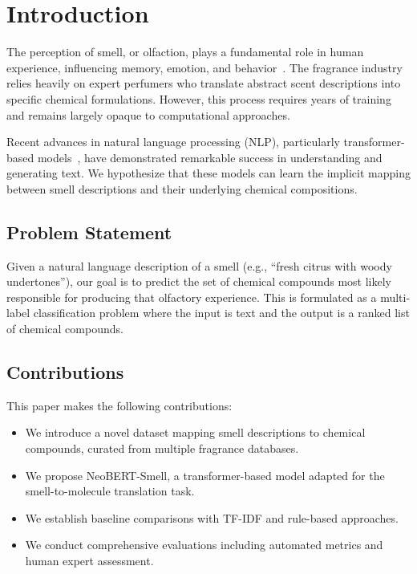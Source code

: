 \section{Introduction}

The perception of smell, or olfaction, plays a fundamental role in human experience, influencing memory, emotion, and behavior~\cite{yeshurun2010smell}. The fragrance industry relies heavily on expert perfumers who translate abstract scent descriptions into specific chemical formulations. However, this process requires years of training and remains largely opaque to computational approaches.

Recent advances in natural language processing (NLP), particularly transformer-based models~\cite{vaswani2017attention, devlin2019bert}, have demonstrated remarkable success in understanding and generating text. We hypothesize that these models can learn the implicit mapping between smell descriptions and their underlying chemical compositions.

\subsection{Problem Statement}

Given a natural language description of a smell (e.g., ``fresh citrus with woody undertones''), our goal is to predict the set of chemical compounds most likely responsible for producing that olfactory experience. This is formulated as a multi-label classification problem where the input is text and the output is a ranked list of chemical compounds.

\subsection{Contributions}

This paper makes the following contributions:
\begin{itemize}
    \item We introduce a novel dataset mapping smell descriptions to chemical compounds, curated from multiple fragrance databases.
    \item We propose NeoBERT-Smell, a transformer-based model adapted for the smell-to-molecule translation task.
    \item We establish baseline comparisons with TF-IDF and rule-based approaches.
    \item We conduct comprehensive evaluations including automated metrics and human expert assessment.
\end{itemize}
